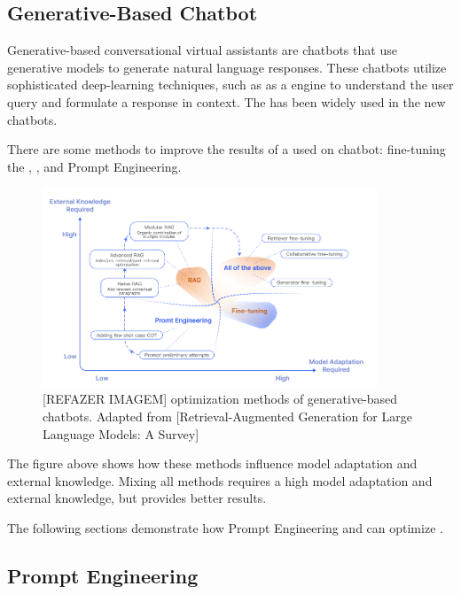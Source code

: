 \subsection{Generative-Based Chatbot}

Generative-based conversational virtual assistants are chatbots that use generative models to generate natural language responses. These chatbots utilize sophisticated deep-learning techniques, such as {\llm} as a {\nlp} engine to understand the user query and formulate a response in context. The {\llm} has been widely used in the new chatbots.


There are some methods to improve the results of a {\llm} used on chatbot: fine-tuning the {\llm}, {\rag}, and Prompt Engineering.

\begin{figure}[ht]
    \includegraphics[width=10cm]{figs/chapter2/otimization_generative_chatbot.png}
    \centering
    \caption{[REFAZER IMAGEM] optimization methods of generative-based chatbots. Adapted from [Retrieval-Augmented Generation for Large Language Models: A Survey]}
\end{figure}

The figure above shows how these methods influence model adaptation and external knowledge. Mixing all methods requires a high model adaptation and external knowledge, but provides better results. 

The following sections demonstrate how Prompt Engineering and {\rag} can optimize {\llm}.



\subsection{Prompt Engineering}

